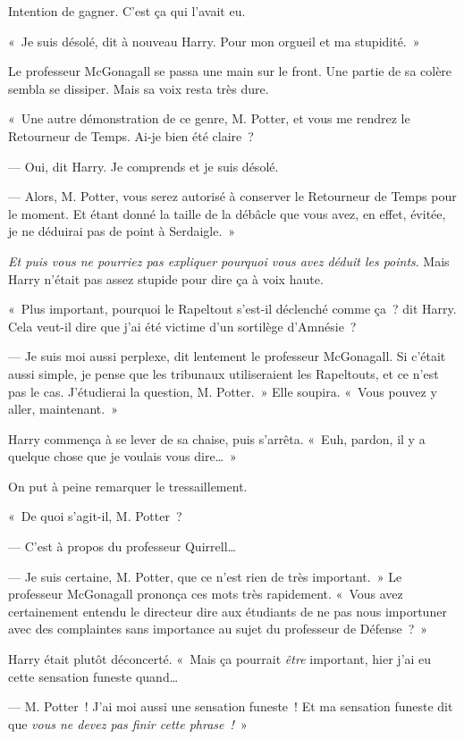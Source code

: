 Intention de gagner. C'est ça qui l'avait eu.

«~Je suis désolé, dit à nouveau Harry. Pour mon orgueil et ma stupidité.~»

Le professeur McGonagall se passa une main sur le front. Une partie de sa colère sembla se dissiper. Mais sa voix resta très dure.

«~Une autre démonstration de ce genre, M. Potter, et vous me rendrez le Retourneur de Temps. Ai-je bien été claire~?

--- Oui, dit Harry. Je comprends et je suis désolé.

--- Alors, M. Potter, vous serez autorisé à conserver le Retourneur de Temps pour le moment. Et étant donné la taille de la débâcle que vous avez, en effet, évitée, je ne déduirai pas de point à Serdaigle.~»

\emph{Et puis vous ne pourriez pas expliquer pourquoi vous avez déduit les points}. Mais Harry n'était pas assez stupide pour dire ça à voix haute.

«~Plus important, pourquoi le Rapeltout s'est-il déclenché comme ça~? dit Harry. Cela veut-il dire que j'ai été victime d'un sortilège d'Amnésie~?

--- Je suis moi aussi perplexe, dit lentement le professeur McGonagall. Si c'était aussi simple, je pense que les tribunaux utiliseraient les Rapeltouts, et ce n'est pas le cas. J'étudierai la question, M. Potter.~» Elle soupira. «~Vous pouvez y aller, maintenant.~»

Harry commença à se lever de sa chaise, puis s'arrêta. «~Euh, pardon, il y a quelque chose que je voulais vous dire…~»

On put à peine remarquer le tressaillement.

«~De quoi s'agit-il, M. Potter~?

--- C'est à propos du professeur Quirrell…

--- Je suis certaine, M. Potter, que ce n'est rien de très important.~» Le professeur McGonagall prononça ces mots très rapidement. «~Vous avez certainement entendu le directeur dire aux étudiants de ne pas nous importuner avec des complaintes sans importance au sujet du professeur de Défense~?~»

Harry était plutôt déconcerté. «~Mais ça pourrait \emph{être} important, hier j'ai eu cette sensation funeste quand…

--- M. Potter~! J'ai moi aussi une sensation funeste~! Et ma sensation funeste dit que \emph{vous ne devez pas finir cette phrase~!}~»

